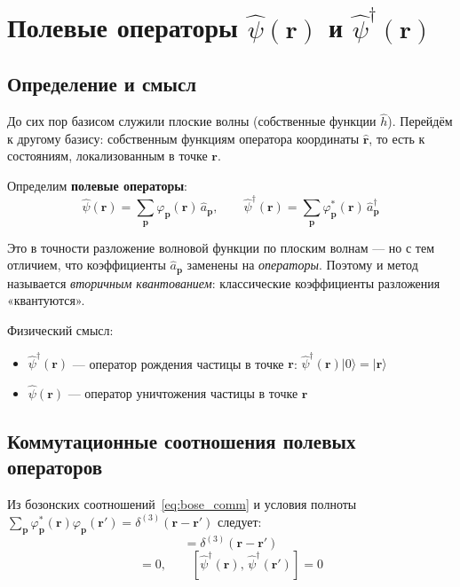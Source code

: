 \documentclass[../general/general]{subfiles}
\begin{document}
\section{Полевые операторы $\hat{\psi}(\mathbf{r})$ и $\hat{\psi}^\dagger(\mathbf{r})$}

\subsection{Определение и смысл}

До сих пор базисом служили плоские волны (собственные функции $\hat{h}$). Перейдём к другому базису: собственным функциям оператора координаты $\hat{\mathbf{r}}$, то есть к состояниям, локализованным в точке $\mathbf{r}$.

Определим \textbf{полевые операторы}:
\begin{equation}
    \hat{\psi}(\mathbf{r}) = \sum_\mathbf{p} \varphi_\mathbf{p}(\mathbf{r})\,\hat{a}_\mathbf{p}, \qquad
    \hat{\psi}^\dagger(\mathbf{r}) = \sum_\mathbf{p} \varphi^*_\mathbf{p}(\mathbf{r})\,\hat{a}^\dagger_\mathbf{p}
    \label{eq:field_ops}
\end{equation}

Это в точности разложение волновой функции по плоским волнам --- но с тем отличием, что коэффициенты $\hat{a}_\mathbf{p}$ заменены на \emph{операторы}. Поэтому и метод называется \emph{вторичным квантованием}: классические коэффициенты разложения «квантуются».

Физический смысл:
\begin{itemize}
    \item $\hat{\psi}^\dagger(\mathbf{r})$ --- оператор рождения частицы в точке $\mathbf{r}$: $\hat{\psi}^\dagger(\mathbf{r})|0\rangle = |\mathbf{r}\rangle$
    \item $\hat{\psi}(\mathbf{r})$ --- оператор уничтожения частицы в точке $\mathbf{r}$
\end{itemize}

\subsection{Коммутационные соотношения полевых операторов}

Из бозонских соотношений~\eqref{eq:bose_comm} и условия полноты $\sum_\mathbf{p}\varphi^*_\mathbf{p}(\mathbf{r})\varphi_\mathbf{p}(\mathbf{r}') = \delta^{(3)}(\mathbf{r}-\mathbf{r}')$ следует:
\begin{equation}
    [\hat{\psi}(\mathbf{r}),\,\hat{\psi}^\dagger(\mathbf{r}')] = \delta^{(3)}(\mathbf{r}-\mathbf{r}')
    \label{eq:field_comm}
\end{equation}
\begin{equation}
    [\hat{\psi}(\mathbf{r}),\,\hat{\psi}(\mathbf{r}')] = 0, \qquad [\hat{\psi}^\dagger(\mathbf{r}),\,\hat{\psi}^\dagger(\mathbf{r}')] = 0
\end{equation}
\end{document}
